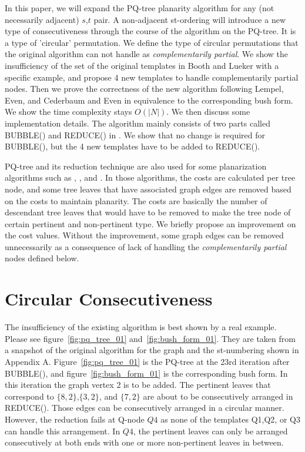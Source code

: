 \documentclass[a4]{jgaa-art}
\begin{document}
In this paper, we will expand the PQ-tree planarity algorithm for any (not necessarily adjacent) $s$,$t$ pair.
A non-adjacent st-ordering will introduce a new type of consecutiveness through the course of the algorithm on the PQ-tree.
It is a type of 'circular' permutation.
We define the type of circular permutations that the original algorithm can not handle 
 as {\it complementarily partial}. 
We show the insufficiency of the set of the original templates in Booth and Lueker \cite{BL76} with a specific example, and propose 4 
new templates to handle complementarily partial nodes.
Then we prove the correctness of the new algorithm following  Lempel, Even, and Cederbaum \cite{LEC67} and Even \cite{EVEN79} in equivalence to the corresponding bush form. 
We show the time complexity stays $O(|N|)$. 
We then discuss some implementation details.
The algorithm mainly consists of two parts called BUBBLE() and REDUCE() in \cite{BL76}.
We show that no change is required for BUBBLE(), but the 4 new templates have to be added to REDUCE().

PQ-tree and its reduction technique are also used for some planarization algorithms such as
\cite{OZAWA81}, \cite{JTS89}, and \cite{KANT92}.
In those algorithms, the costs are calculated per tree node, 
and some tree leaves that have associated graph edges are removed based on the costs to maintain planarity.
The costs are basically the number of descendant tree leaves that would have to be removed to 
make the tree node of certain pertinent and non-pertinent type.
We briefly propose an improvement on the cost values.
Without the improvement, some graph edges can be removed unnecessarily as a consequence of lack of handling the {\it complementarily partial} nodes defined below.


\section{Circular Consecutiveness}\label{se:insuff}

The insufficiency of the existing algorithm is best shown by a real example.
Please see figure~\ref{fig:pq_tree_01} and~\ref{fig:bush_form_01}.
They are taken from a snapshot of the original algorithm for the graph and the st-numbering shown in Appendix A.
Figure~\ref{fig:pq_tree_01} is the PQ-tree at the 23rd iteration after 
BUBBLE(), and figure~\ref{fig:bush_form_01} is the corresponding bush form.
In this iteration the graph vertex $2$ is to be added.
The pertinent leaves that correspond to $\{8,2\}$,$\{3,2\}$, and $\{7,2\}$
 are about to be consecutively arranged in REDUCE().
Those edges can be consecutively arranged in a circular manner.
However, the reduction fails at Q-node $Q4$ as none of the templates Q1,Q2, 
or Q3 can handle this arrangement.
In $Q4$, the pertinent leaves can only be arranged consecutively
 at both ends with one or more non-pertinent leaves in between.
\end{document}
